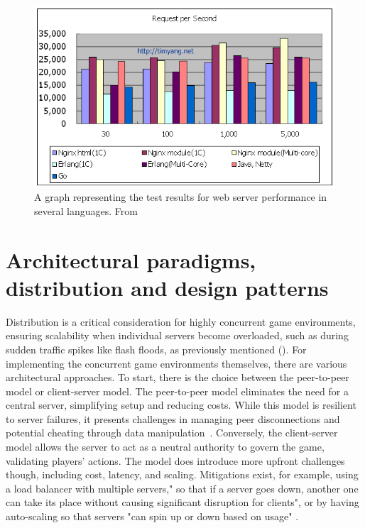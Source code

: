 \documentclass[]{final}
\begin{document}
\begin{figure}[ht!]
  \centering
  \includegraphics[width=.8\linewidth]{c_erlang_java_go}
  \caption{A graph representing the test results for web server performance in several languages. From \cite{yang_c_nodate}}
  \label{fig: 1}
\end{figure}


\chapter{Architectural paradigms, distribution and design patterns}


Distribution is a critical consideration for highly concurrent game
environments, ensuring scalability when individual servers become
overloaded, such as during sudden traffic spikes like flash floods, as
previously mentioned {\hypersetup{linkcolor=teal}(\pageref{rationale_problem})}.
For implementing the concurrent game environments themselves, there are various architectural approaches.
To start, there is the choice between the peer-to-peer model or client-server model.
The peer-to-peer model eliminates the need for a central server, simplifying setup and
reducing costs. While this model is resilient to server failures, it presents challenges
in managing peer disconnections and potential cheating through data manipulation~\cite{franchetti_coping_2020}.
Conversely, the client-server model allows the server to act as a neutral authority to govern the game,
validating players' actions. The model does introduce more upfront challenges though, including cost,
latency, and scaling. Mitigations exist, for example, using a load balancer with multiple servers," so
that if a server goes down, another one can take its place without causing significant
disruption for clients", or by having auto-scaling so that servers "can spin up or down
based on usage" \cite{pandey_peer--peer_2022}.
\end{document}
